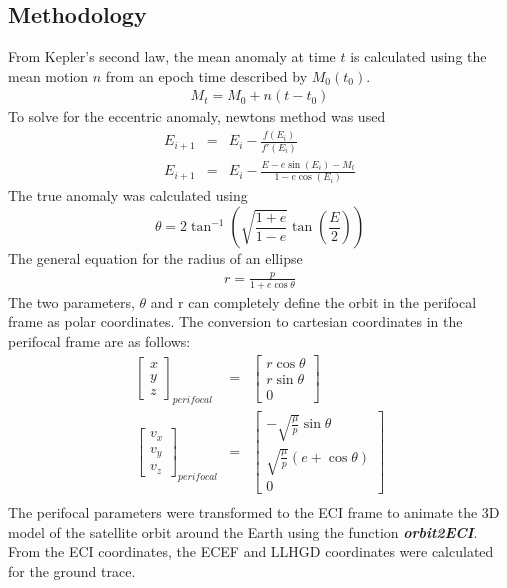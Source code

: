 \documentclass[Space3_Assign1.tex]{subfiles}
\begin{document}
\subsection{Methodology}
From Kepler's second law, the mean anomaly at time $\textit{t}$ is calculated using the mean motion $\textit{n}$ from an epoch time described by $M_0(t_0)$. 
\begin{eqnarray}
M_t = M_0 + n(t-t_0)
\end{eqnarray}
To solve for the eccentric anomaly, newtons method was used
\begin{eqnarray}
E_{i+1} &=& E_i - \frac{f(E_i)}{f'(E_i)}\\
E_{i+1} &=& E_i - \frac{E-e\sin(E_i)-M_t}{1-e\cos(E_i)}
\end{eqnarray}
The true anomaly was calculated using
\begin{equation}
\theta = 2\tan^{-1}\left(\sqrt{\frac{1+e}{1-e}}\tan\left(\frac{E}{2}\right)\right) \label{trueanom}
\end{equation} 
The general equation for the radius of an ellipse
\begin{eqnarray}
r = \frac{p}{1+e\cos\theta}
\end{eqnarray}
The two parameters, $\theta$ and r can completely define the orbit in the perifocal frame as polar coordinates. The conversion to cartesian coordinates in the perifocal frame are as follows:
\begin{eqnarray}
\left[ \begin{array}{c}
x\\y\\z
\end{array} \right]_{perifocal} &=& \left[ \begin{array}{c}
r\cos\theta \\ r\sin \theta \\ 0
\end{array} \right] \\
\left[ \begin{array}{c}
v_x\\v_y\\v_z
\end{array} \right]_{perifocal} &=& \left[ \begin{array}{c}
-\sqrt{\frac{\mu}{p}}\sin\theta \\\sqrt{\frac{\mu}{p}}(e+\cos\theta) \\ 0
\end{array} \right] \\
\end{eqnarray}
The perifocal parameters were transformed to the ECI frame to animate the 3D model of the satellite orbit around the Earth using the function \textit{\textbf{orbit2ECI}}. From the ECI coordinates, the ECEF and LLHGD coordinates were calculated for the ground trace.
\end{document}

